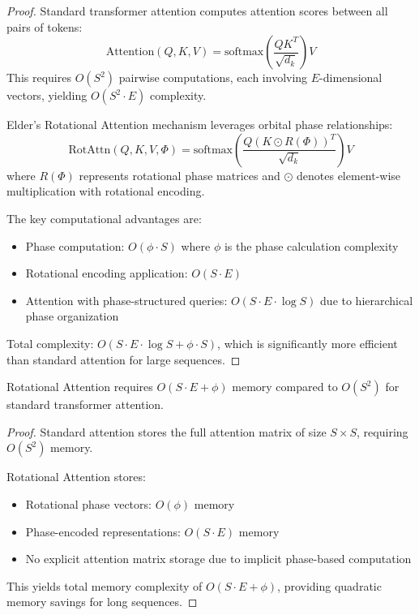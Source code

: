 \begin{proof}
Standard transformer attention computes attention scores between all pairs of tokens:
\begin{equation}
\text{Attention}(Q,K,V) = \text{softmax}\left(\frac{QK^T}{\sqrt{d_k}}\right)V
\end{equation}
This requires $O(S^2)$ pairwise computations, each involving $E$-dimensional vectors, yielding $O(S^2 \cdot E)$ complexity.

Elder's Rotational Attention mechanism leverages orbital phase relationships:
\begin{equation}
\text{RotAttn}(Q,K,V,\Phi) = \text{softmax}\left(\frac{Q(K \odot R(\Phi))^T}{\sqrt{d_k}}\right)V
\end{equation}
where $R(\Phi)$ represents rotational phase matrices and $\odot$ denotes element-wise multiplication with rotational encoding.

The key computational advantages are:
\begin{itemize}
    \item Phase computation: $O(\phi \cdot S)$ where $\phi$ is the phase calculation complexity
    \item Rotational encoding application: $O(S \cdot E)$ 
    \item Attention with phase-structured queries: $O(S \cdot E \cdot \log S)$ due to hierarchical phase organization
\end{itemize}

Total complexity: $O(S \cdot E \cdot \log S + \phi \cdot S)$, which is significantly more efficient than standard attention for large sequences.
\end{proof}

\begin{theorem}
Rotational Attention requires $O(S \cdot E + \phi)$ memory compared to $O(S^2)$ for standard transformer attention.
\end{theorem}

\begin{proof}
Standard attention stores the full attention matrix of size $S \times S$, requiring $O(S^2)$ memory.

Rotational Attention stores:
\begin{itemize}
    \item Rotational phase vectors: $O(\phi)$ memory
    \item Phase-encoded representations: $O(S \cdot E)$ memory
    \item No explicit attention matrix storage due to implicit phase-based computation
\end{itemize}

This yields total memory complexity of $O(S \cdot E + \phi)$, providing quadratic memory savings for long sequences.
\end{proof}

